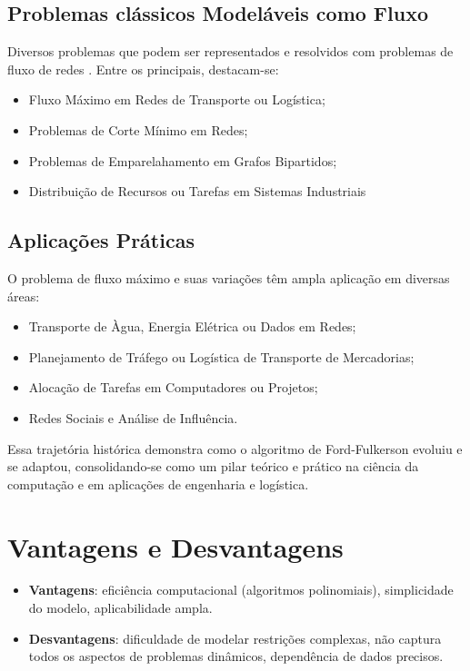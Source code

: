 \documentclass[12pt]{article}
\begin{document}
\subsection{Problemas clássicos Modeláveis como Fluxo} 

Diversos problemas que podem ser representados e resolvidos com problemas de fluxo de redes \cite{ahuja1993, cormen2009}. Entre os principais, destacam-se: 

\begin{itemize} 
\item Fluxo Máximo em Redes de Transporte ou Logística;
\item Problemas de Corte Mínimo em Redes; 
\item Problemas de Emparelahamento em Grafos Bipartidos;  
\item Distribuição de Recursos ou Tarefas em Sistemas Industriais 
\end{itemize}


\subsection{Aplicações Práticas}

O problema de fluxo máximo e suas variações têm ampla aplicação em diversas áreas:


\begin{itemize}
    \item Transporte de Àgua, Energia Elétrica ou Dados em Redes;
    \item Planejamento de Tráfego ou Logística de Transporte de Mercadorias;
    \item Alocação de Tarefas em Computadores ou Projetos;
    \item Redes Sociais e Análise de Influência.
\end{itemize}


Essa trajetória histórica demonstra como o algoritmo de Ford-Fulkerson evoluiu e se adaptou, consolidando-se como um pilar teórico e prático na ciência da computação e em aplicações de engenharia e logística.


\section{Vantagens e Desvantagens} \label{sec:vantagens}

\begin{itemize}
    \item \textbf{Vantagens}: eficiência computacional (algoritmos polinomiais), simplicidade do modelo, aplicabilidade ampla.
    \item \textbf{Desvantagens}: dificuldade de modelar restrições complexas, não captura todos os aspectos de problemas dinâmicos, dependência de dados precisos.
\end{itemize}
\end{document}
